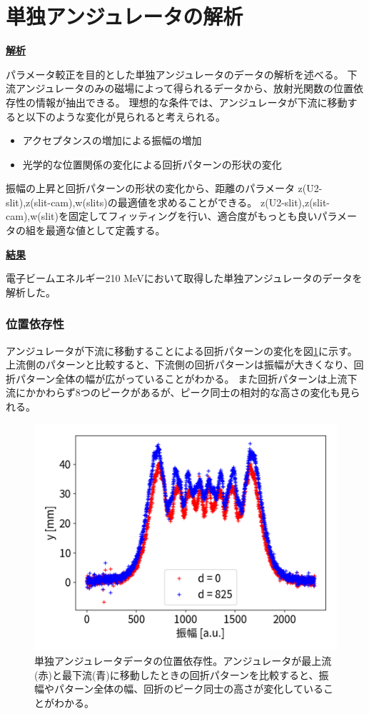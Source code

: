 \documentclass[a4paper,11pt,uplatex]{jsbook}
\begin{document}
\section{単独アンジュレータの解析}
\noindent \textbf{\underline{解析}}\par
パラメータ較正を目的とした単独アンジュレータのデータの解析を述べる。
下流アンジュレータのみの磁場によって得られるデータから、放射光関数の位置依存性の情報が抽出できる。
理想的な条件では、アンジュレータが下流に移動すると以下のような変化が見られると考えられる。
\begin{itemize}
  \item アクセプタンスの増加による振幅の増加
  \item 光学的な位置関係の変化による回折パターンの形状の変化
\end{itemize}

振幅の上昇と回折パターンの形状の変化から、距離のパラメータ z(U2-slit),z(slit-cam),w(slits)の最適値を求めることができる。
z(U2-slit),z(slit-cam),w(slit)を固定してフィッティングを行い、適合度がもっとも良いパラメータの組を最適な値として定義する。

\noindent \textbf{\underline{結果}}\par
電子ビームエネルギー210 MeVにおいて取得した単独アンジュレータのデータを解析した。
\subsubsection{位置依存性}
アンジュレータが下流に移動することによる回折パターンの変化を図\ref{DCposdep}に示す。上流側のパターンと比較すると、下流側の回折パターンは振幅が大きくなり、回折パターン全体の幅が広がっていることがわかる。
また回折パターンは上流下流にかかわらず8つのピークがあるが、ピーク同士の相対的な高さの変化も見られる。
\begin{figure}
  \centering
  \includegraphics[width=0.8\linewidth]{image/4-DCposdep.png}
  \caption[アンジュレータ位置依存性]{単独アンジュレータデータの位置依存性。アンジュレータが最上流(赤)と最下流(青)に移動したときの回折パターンを比較すると、振幅やパターン全体の幅、回折のピーク同士の高さが変化していることがわかる。}\label{DCposdep}
\end{figure}
\end{document}
